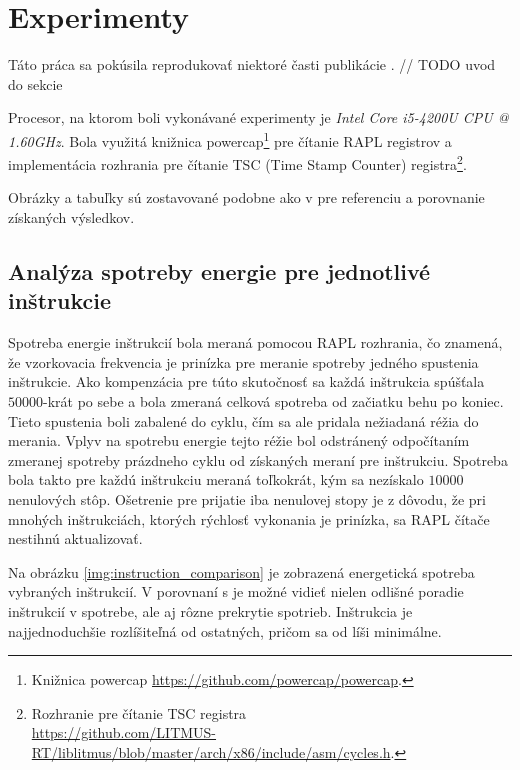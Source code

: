 \section{Experimenty}
Táto práca sa pokúsila reprodukovať niektoré časti publikácie \cite{Platypus}.
// TODO uvod do sekcie

Procesor, na ktorom boli vykonávané experimenty je \emph{Intel Core i5-4200U CPU @ 1.60GHz}. Bola využitá knižnica
powercap\footnote{Knižnica powercap \href{https://github.com/powercap/powercap}{https://github.com/powercap/powercap}.} pre čítanie RAPL registrov
a implementácia rozhrania pre čítanie TSC (Time Stamp Counter) registra\footnote{Rozhranie pre čítanie TSC registra\\\href{https://github.com/LITMUS-RT/liblitmus/blob/master/arch/x86/include/asm/cycles.h}{https://github.com/LITMUS-RT/liblitmus/blob/master/arch/x86/include/asm/cycles.h}.}.

Obrázky a tabuľky sú zostavované podobne ako v \cite{Platypus} pre referenciu a porovnanie získaných výsledkov.

\subsection{Analýza spotreby energie pre jednotlivé inštrukcie}
Spotreba energie inštrukcií bola meraná pomocou RAPL rozhrania, čo znamená, že vzorkovacia frekvencia je prinízka pre meranie spotreby jedného spustenia inštrukcie.
Ako kompenzácia pre túto skutočnosť sa každá inštrukcia spúšťala $50000$-krát po sebe a bola zmeraná celková spotreba od začiatku behu po koniec. Tieto spustenia
boli zabalené do cyklu, čím sa ale pridala nežiadaná réžia do merania. Vplyv na spotrebu energie tejto réžie bol odstránený odpočítaním zmeranej spotreby
prázdneho cyklu od získaných meraní pre inštrukciu. Spotreba bola takto pre každú inštrukciu meraná toľkokrát, kým sa nezískalo $10000$ nenulových stôp.
Ošetrenie pre prijatie iba nenulovej stopy je z dôvodu, že pri mnohých inštrukciách, ktorých rýchlosť vykonania je prinízka, sa RAPL čítače nestihnú aktualizovať.

Na obrázku \ref{img:instruction_comparison} je zobrazená energetická spotreba vybraných inštrukcií. V porovnaní s \cite{Platypus} je možné vidieť nielen odlišné
poradie inštrukcií v spotrebe, ale aj rôzne prekrytie spotrieb. Inštrukcia  je najjednoduchšie rozlíšiteľná od ostatných, pričom  sa
od  líši minimálne.

